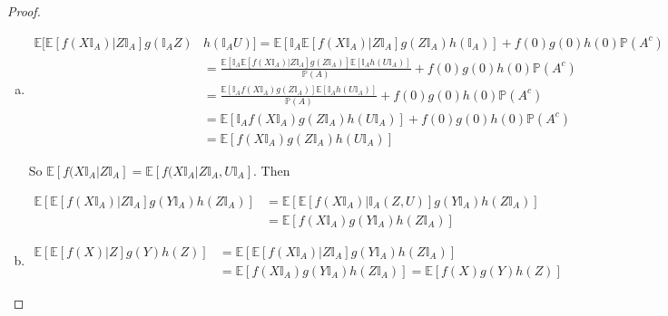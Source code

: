 \documentclass[12pt]{article}
\newcommand{\mb}{\mathbb}
\newcommand{\pr}{\mb{P}}							%
\newcommand{\ex}[1]{\mb{E}\left[#1\right]}			%
\newcommand{\Xf}{X}									%
\newcommand{\Xg}{Y}									%
\newcommand{\Xh}{Z}									%
\newcommand{\typset}{A}							%
\begin{document}
\begin{proof}
\begin{enumerate}[(a)]
By linearity, this also holds for all bounded and measurable \(f,g\) and \(h\) with no restrictions on \(f(0),g(0),h(0)\), so the proof is complete.

\item 

\begin{align*}
\mb{E}\bigg[\ex{f(\Xf\mb{I}_\typset)| \Xh\mb{I}_\typset}g(\mb{I}_\typset\Xh)&h(\mb{I}_\typset U)\bigg] = \ex{\mb{I}_\typset\ex{f(\Xf\mb{I}_\typset)|\Xh\mb{I}_\typset}g(\Xh\mb{I}_\typset)h(\mb{I}_\typset)} + f(0)g(0)h(0)\pr(\typset^c)\\
&=\frac{\ex{\mb{I}_\typset\ex{f(\Xf\mb{I}_\typset)|\Xh\mb{I}_\typset}g(\Xh\mb{I}_\typset)}\ex{\mb{I}_\typset h(U\mb{I}_\typset)}}{\pr(\typset)} + f(0)g(0)h(0)\pr(\typset^c)\\
&=\frac{\ex{\mb{I}_\typset f(\Xf\mb{I}_\typset)g(\Xh\mb{I}_\typset)}\ex{\mb{I}_\typset h(U\mb{I}_\typset)}}{\pr(\typset)} + f(0)g(0)h(0)\pr(\typset^c)\\
&=\ex{\mb{I}_\typset f(\Xf\mb{I}_\typset)g(\Xh\mb{I}_\typset)h(U\mb{I}_\typset)} + f(0)g(0)h(0)\pr(\typset^c)\\
&= \ex{f(\Xf\mb{I}_\typset)g(\Xh\mb{I}_\typset)h(U\mb{I}_\typset)}
\end{align*}

So \(\ex{f(\Xf\mb{I}_\typset|\Xh\mb{I}_\typset} = \ex{f(\Xf\mb{I}_\typset|\Xh\mb{I}_\typset,U\mb{I}_\typset}\). Then 

\begin{align*}
\ex{\ex{f(\Xf\mb{I}_\typset)|\Xh\mb{I}_\typset}g(\Xg\mb{I}_\typset)h(\Xh\mb{I}_\typset)} &= \ex{\ex{f(\Xf\mb{I}_\typset)|\mb{I}_\typset(\Xh,U)}g(\Xg\mb{I}_\typset)h(\Xh\mb{I}_\typset)}\\
&=\ex{f(\Xf\mb{I}_\typset)g(\Xg\mb{I}_\typset)h(\Xh\mb{I}_\typset)}
\end{align*}

\item 
\begin{align*}
\ex{\ex{f(\Xf)|\Xh}g(\Xg)h(\Xh)} &= \ex{\ex{f(\Xf\mb{I}_\typset)|\Xh\mb{I}_\typset}g(\Xg\mb{I}_\typset)h(\Xh\mb{I}_\typset)}\\
&= \ex{f(\Xf\mb{I}_\typset)g(\Xg\mb{I}_\typset)h(\Xh\mb{I}_\typset)} = \ex{f(\Xf)g(\Xg)h(\Xh)}
\end{align*}
\end{enumerate}
\end{proof}
\end{document}
